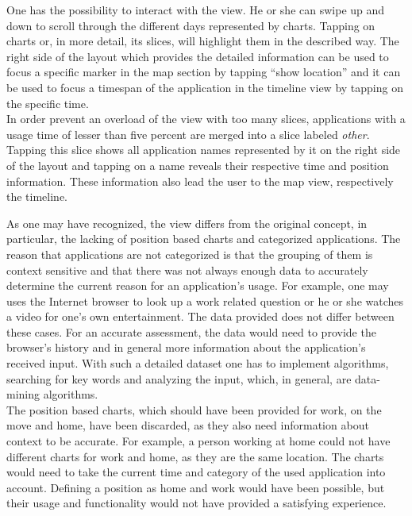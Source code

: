 One  has the possibility to interact with the view. He or she can swipe up and down to scroll through the different days represented by charts. Tapping on charts or, in more detail, its slices, will highlight them in the described way. The right side of the layout which provides the detailed information can be used to focus a specific marker in the map section by tapping ``show location'' and it can be used to focus a timespan of the application in the timeline view by tapping on the specific time.\\
In order prevent an overload of the view with too many slices, applications with a usage time of lesser than five percent are merged into a slice labeled \emph{other}. Tapping this slice shows all application names represented by it on the right side of the layout and tapping on a name reveals their respective time and position information. These information also lead the user to the map view, respectively the timeline.

As  one may have recognized, the view differs from the original concept, in particular, the lacking of position based charts and categorized applications. The reason that applications are not categorized is that the grouping of them is context sensitive and that there was not always enough data to accurately determine the current reason for an application's usage. For example, one may uses the Internet browser to look up a work related question or he or she watches a video for one's own entertainment. The data provided does not differ between these cases. For an accurate assessment, the data would need to provide the browser's history and in general more information about the application's received input. With such a detailed dataset one has to implement algorithms, searching for key words and analyzing the input, which, in general, are data-mining algorithms.\\
The position based charts, which should have been provided for work, on the move and home, have been discarded, as they also need information about context to be accurate. For example, a person working at home could not have different charts for work and home, as they are the same location. The charts would need to take the current time and category of the used application into account. Defining a position as home and work would have been possible, but their usage and functionality would not have provided a satisfying experience.

